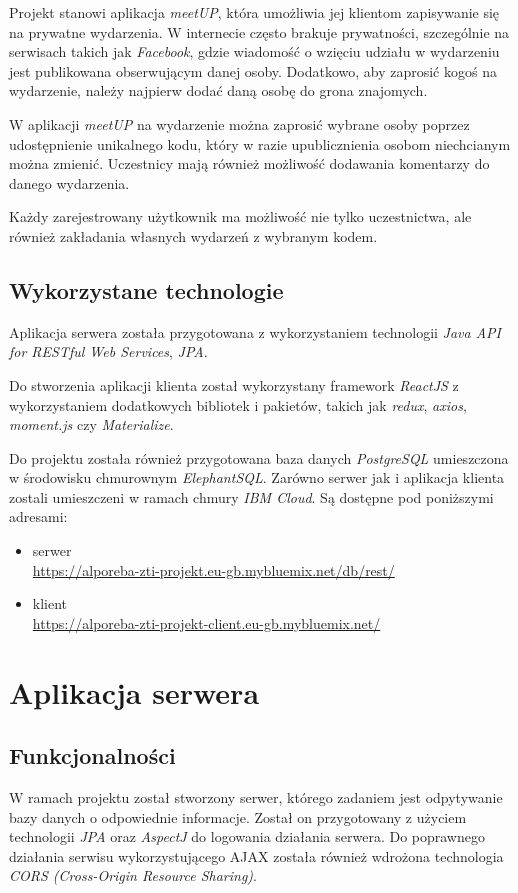 \documentclass[12pt]{article}
\begin{document}
Projekt stanowi aplikacja \textit{meetUP}, która umożliwia jej klientom zapisywanie się na prywatne wydarzenia. W internecie często brakuje prywatności, szczególnie na serwisach takich jak \textit{Facebook}, gdzie wiadomość o wzięciu udziału w wydarzeniu jest publikowana obserwującym danej osoby. Dodatkowo, aby zaprosić kogoś na wydarzenie, należy najpierw dodać daną osobę do grona znajomych.

W aplikacji \textit{meetUP} na wydarzenie można zaprosić wybrane osoby poprzez udostępnienie unikalnego kodu, który w razie upublicznienia osobom niechcianym można zmienić. Uczestnicy mają również możliwość dodawania komentarzy do danego wydarzenia.

Każdy zarejestrowany użytkownik ma możliwość nie tylko uczestnictwa, ale również zakładania własnych wydarzeń z wybranym kodem.


\subsection{Wykorzystane technologie}
Aplikacja serwera została przygotowana z wykorzystaniem technologii \textit{Java API for RESTful Web Services}, \textit{JPA}.

Do stworzenia aplikacji klienta został wykorzystany framework \textit{ReactJS} z wykorzystaniem dodatkowych bibliotek i pakietów, takich jak \textit{redux}, \textit{axios}, \textit{moment.js} czy \textit{Materialize}.

Do projektu została również przygotowana baza danych \textit{PostgreSQL} umieszczona w środowisku chmurownym \textit{ElephantSQL}. Zarówno serwer jak i aplikacja klienta zostali umieszczeni w ramach chmury \textit{IBM Cloud}. Są dostępne pod poniższymi adresami:
\begin{itemize}
\item serwer \\ \url{https://alporeba-zti-projekt.eu-gb.mybluemix.net/db/rest/}
\item klient \\ \url{https://alporeba-zti-projekt-client.eu-gb.mybluemix.net/}
\end{itemize}

\pagebreak
\section{Aplikacja serwera}
\subsection{Funkcjonalności}
W ramach projektu został stworzony serwer, którego zadaniem jest odpytywanie bazy danych o odpowiednie informacje. Został on przygotowany z użyciem technologii \textit{JPA} oraz \textit{AspectJ} do logowania działania serwera. Do poprawnego działania serwisu wykorzystującego AJAX została również wdrożona technologia \textit{CORS (Cross-Origin Resource Sharing)}.
\end{document}
